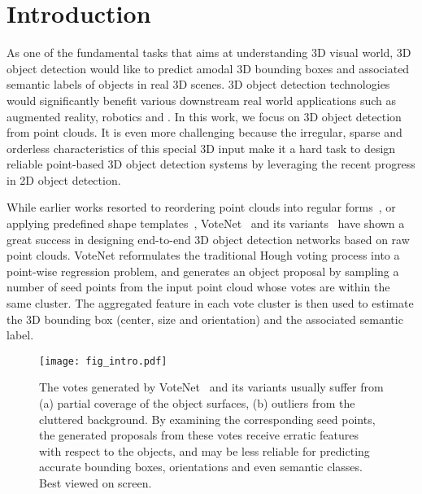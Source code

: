 \documentclass[final]{cvpr}
\begin{document}
\section{Introduction}

As one of the fundamental tasks that aims at understanding 3D visual world, 3D object detection would like to predict amodal 3D bounding boxes and associated semantic labels of objects in real 3D scenes.
3D object detection technologies would significantly benefit various downstream real world applications such as augmented reality, robotics and \etc.
In this work, we focus on 3D object detection from point clouds.
It is even more challenging because the irregular, sparse and orderless characteristics of this special 3D input make it a hard task to design reliable point-based 3D object detection systems by leveraging the recent progress in 2D object detection.

While earlier works resorted to reordering point clouds into regular forms~\cite{chen2017multi,3d-sis,song2014sliding,dss,zhou2018voxelnet}, or applying predefined shape templates~\cite{li2015database,nan2012search,gspn}, VoteNet~\cite{votenet} and its variants~\cite{mlcvnet,h3dnet,hgnet, ahmed2020density} have shown a great success in designing end-to-end 3D object detection networks based on raw point clouds.
VoteNet reformulates the traditional Hough voting process into a point-wise regression problem, and generates an object proposal by sampling a number of seed points from the input point cloud whose votes are within the same cluster.
The aggregated feature in each vote cluster is then used to estimate the 3D bounding box (\eg center, size and orientation) and the associated semantic label.

\begin{figure}[t]
    \centering
    \texttt{[image: fig\_intro.pdf]}
    \caption{The votes generated by VoteNet~\cite{votenet} and its variants usually suffer from (a) partial coverage of the object surfaces, (b) outliers from the cluttered background. By examining the corresponding seed points, the generated proposals from these votes receive erratic features with respect to the objects, and may be less reliable for predicting accurate bounding boxes, orientations and even semantic classes. Best viewed on screen.}
    \label{fig:intro}
\end{figure}
\end{document}
